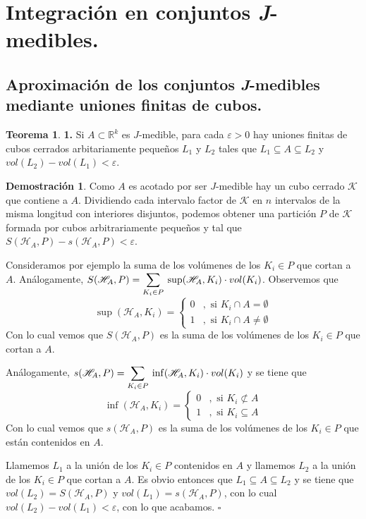 \documentclass[12pt,twoside]{report}
\newcommand\mc[1]{\mathcal{#1}}
\theoremstyle{azul}
\theoremstyle{azul2}
\theoremstyle{plain}
\theoremstyle{definition}
\newtheorem*{dem}{Demostración}
\newtheorem*{theo}{Teorema}
\theoremstyle{remark}
\begin{document}
\section{Integración en conjuntos \textit{J}-medibles.}
\subsection{Aproximación de los conjuntos \textit{J}-medibles mediante uniones finitas de cubos.}
\begin{theo} \label{teo1} \textbf{1.}
Si $A \subset \mathbb{R}^k$ es $J$-medible, para cada $\varepsilon > 0$ hay uniones finitas de cubos cerrados arbitariamente pequeños $L_1$ y $L_2$ tales que $L_1 \subseteq A \subseteq L_2$ y $vol(L_2) - vol(L_1) < \varepsilon$.
\begin{dem}

Como $A$ es acotado por ser $J$-medible hay un cubo cerrado $\mc{K}$ que contiene a $A$. Dividiendo cada intervalo factor de $\mc{K}$ en $n$ intervalos de la misma longitud con interiores disjuntos, podemos obtener una partición $P$ de $\mc{K}$ formada por cubos arbitrariamente pequeños y tal que $S(\mathscr{H}_A,P)-s(\mathscr{H}_A,P) < \varepsilon$.

Consideramos por ejemplo la suma de los volúmenes de los $K_i \in P$ que cortan a $A$. Análogamente, $S(\mathscr{H}_A,P)=\underset{K_i \in P}{\mathlarger{\sum}} \: \sup(\mathscr{H}_A,K_i) \cdot vol(K_i)$. Observemos que 
$$\sup(\mathscr{H}_A,K_i)=\left\{ \begin{array}{ll}
     0 & , \text{ si } K_i \cap A = \emptyset \\
     1 & , \text{ si } K_i \cap A \neq \emptyset 
\end{array}\right.$$
Con lo cual vemos que $S(\mathscr{H}_A,P)$ es la suma de los volúmenes de los $K_i \in P$ que cortan a $A$.

Análogamente,  $s(\mathscr{H}_A,P)=\underset{K_i \in P}{\mathlarger{\sum}} \: \inf(\mathscr{H}_A,K_i) \cdot vol(K_i)$ y se tiene que 
$$\inf(\mathscr{H}_A,K_i)=\left\{ \begin{array}{ll}
     0 & , \text{ si } K_i \nsubset A \\
     1 & , \text{ si } K_i \subseteq A 
\end{array}\right.$$ Con lo cual vemos que $s(\mathscr{H}_A,P)$ es la suma de los volúmenes de los $K_i \in P$ que están contenidos en $A$. \newpage

Llamemos $L_1$ a la unión de los $K_i \in P$ contenidos en $A$ y llamemos $L_2$ a la unión de los $K_i \in P$ que cortan a $A$. Es obvio entonces que $L_1 \subseteq A \subseteq L_2$ y se tiene que $vol(L_2)=S(\mathscr{H}_A,P)$ y $vol(L_1)=s(\mathscr{H}_A,P)$, con lo cual $vol(L_2)-vol(L_1)< \varepsilon$, con lo que acabamos. \hfill $\square$
\end{dem}
\end{theo}
\end{document}
